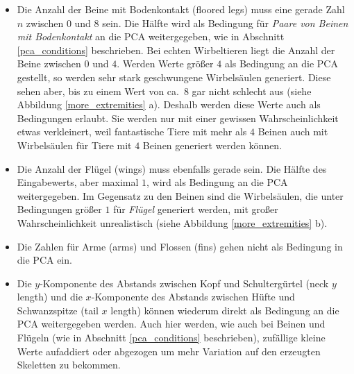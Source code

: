 \begin{itemize}
 \item Die Anzahl der Beine mit Bodenkontakt (floored legs) muss eine gerade Zahl $n$ zwischen $0$ und $8$ sein. Die Hälfte wird als Bedingung für \emph{Paare von Beinen mit Bodenkontakt} an die PCA weitergegeben, wie in Abschnitt \ref{pca_conditions} beschrieben. Bei echten Wirbeltieren liegt die Anzahl der Beine zwischen $0$ und $4$. Werden Werte größer $4$ als Bedingung an die PCA gestellt, so werden sehr stark geschwungene Wirbelsäulen generiert. Diese sehen aber, bis zu einem Wert von ca.\ $8$ gar nicht schlecht aus (siehe Abbildung \ref{more_extremities} a). Deshalb werden diese Werte auch als Bedingungen erlaubt. Sie werden nur mit einer gewissen Wahrscheinlichkeit etwas verkleinert, weil fantastische Tiere mit mehr als $4$ Beinen auch mit Wirbelsäulen für Tiere mit $4$ Beinen generiert werden können.
 
 \item Die Anzahl der Flügel (wings) muss ebenfalls gerade sein. Die Hälfte des Eingabewerts, aber maximal $1$, wird als Bedingung an die PCA weitergegeben.
 Im Gegensatz zu den Beinen sind die Wirbelsäulen, die unter Bedingungen größer $1$ für \emph{Flügel} generiert werden, mit großer Wahrscheinlichkeit unrealistisch (siehe Abbildung \ref{more_extremities} b).
 
 \item Die Zahlen für Arme (arms) und Flossen (fins) gehen nicht als Bedingung in die PCA ein.
 
 \item Die $y$-Komponente des Abstands zwischen Kopf und Schultergürtel (neck $y$ length) und die $x$-Komponente des Abstands zwischen Hüfte und Schwanzspitze (tail $x$ length) können wiederum direkt als Bedingung an die PCA weitergegeben werden. Auch hier werden, wie auch bei Beinen und Flügeln (wie in Abschnitt \ref{pca_conditions} beschrieben), zufällige kleine Werte aufaddiert oder abgezogen um mehr Variation auf den erzeugten Skeletten zu bekommen.
\end{itemize}

